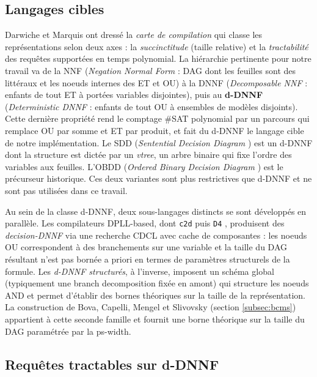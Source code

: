 \documentclass[11pt,a4paper]{report}
\theoremstyle{plain}
\theoremstyle{definition}
\begin{document}
\subsection{Langages cibles}

Darwiche et Marquis \cite{darwiche2002} ont dressé la \emph{carte de
compilation} qui classe les représentations selon deux axes : la
\emph{succinctitude} (taille relative) et la \emph{tractabilité} des
requêtes supportées en temps polynomial. La hiérarchie pertinente pour
notre travail va de la NNF (\emph{Negation Normal Form} : DAG dont les
feuilles sont des littéraux et les noeuds internes des ET et OU) à la
DNNF (\emph{Decomposable NNF} : enfants de tout ET à portées variables
disjointes), puis au \textbf{d-DNNF} (\emph{Deterministic DNNF} : enfants
de tout OU à ensembles de modèles disjoints). Cette dernière propriété
rend le comptage \#SAT polynomial par un parcours qui remplace OU par
somme et ET par produit, et fait du d-DNNF le langage cible de notre
implémentation. Le SDD (\emph{Sentential Decision Diagram}
\cite{darwiche2011}) est un d-DNNF dont la structure est dictée par un
\emph{vtree}, un arbre binaire qui fixe l'ordre des variables aux
feuilles. L'OBDD (\emph{Ordered Binary Decision Diagram}
\cite{bryant1986}) est le précurseur historique. Ces deux variantes
sont plus restrictives que d-DNNF et ne sont pas utilisées dans ce
travail.

Au sein de la classe d-DNNF, deux sous-langages distincts se sont
développés en parallèle. Les compilateurs DPLL-based, dont \texttt{c2d}
puis \texttt{D4} \cite{lagniez2017}, produisent des
\emph{decision-DNNF} via une recherche CDCL avec cache de composantes :
les noeuds OU correspondent à des branchements sur une variable et la
taille du DAG résultant n'est pas bornée a priori en termes de paramètres
structurels de la formule. Les \emph{d-DNNF structurés}, à l'inverse,
imposent un schéma global (typiquement une branch decomposition fixée
en amont) qui structure les noeuds AND et permet d'établir des bornes
théoriques sur la taille de la représentation. La construction de
Bova, Capelli, Mengel et Slivovsky (section \ref{subsec:bcms}) appartient
à cette seconde famille et fournit une borne théorique sur la taille du
DAG paramétrée par la ps-width.

\subsection{Requêtes tractables sur d-DNNF}
\label{subsec:queries-ddnnf}
\end{document}
